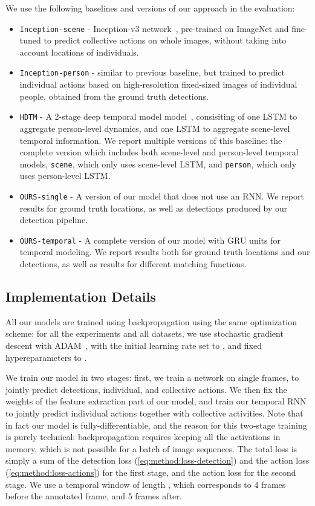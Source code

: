 \documentclass[10pt,twocolumn,letterpaper]{article}
\begin{document}
We use the following baselines and versions of our approach in the evaluation:
\begin{itemize}
\setlength\itemsep{0cm}
\item \texttt{Inception-scene} - Inception-v3 network~\cite{Szegedy2015},
  pre-trained on ImageNet and fine-tuned to predict collective actions on whole
  images, without taking into account locations of individuals.
\item \texttt{Inception-person} - similar to previous baseline, but trained to
  predict individual actions based on high-resolution fixed-sized images of
  individual people, obtained from the ground truth detections.
\item \texttt{HDTM} - A 2-stage deep temporal model model~\cite{Ibrahim2016},
  consisiting of one LSTM to aggregate person-level dynamics, and one LSTM to
  aggregate scene-level temporal information. We report multiple versions of this
  baseline: the complete version which includes both scene-level and person-level 
  temporal models, \texttt{scene}, which only uses scene-level LSTM, 
  and \texttt{person}, which only uses person-level LSTM.
\item \texttt{OURS-single} - A version of our model that does not use an RNN. 
We report results for ground truth locations, as well as detections
  produced by our detection pipeline.
\item \texttt{OURS-temporal} - A complete version of our model with GRU units for
  temporal modeling. We report results both for ground truth locations and our detections,
  as well as results for different matching functions.
\end{itemize}



\subsection{Implementation Details}
\label{sec:evaluation:implementation}

All our models are trained using backpropagation using the same optimization
scheme: for all the experiments and all datasets, we use stochastic gradient descent with
ADAM~\cite{Kingma2014}, with the initial learning rate set to , and
fixed hypereparameters to .


We train our model in two stages: first, we train a network on single frames, 
to jointly predict detections, individual, and collective actions. We then fix 
the weights of the feature extraction part of our model, and train our temporal RNN 
to jointly predict individual actions together with collective activities. 
Note that in fact our model is fully-differentiable, and the reason for this 
two-stage training is purely technical: backpropagation requires keeping all the
activations in memory, which is not possible for a batch of image sequences.
The total loss is simply a sum of the detection loss (\ref{eq:method:loss-detection}) 
and the action loss (\ref{eq:method:loss-actions}) for the first stage, and the action
loss for the second stage. We use a temporal window of length , which 
corresponds to 4 frames before the annotated frame, and 5 frames after. 
\end{document}
